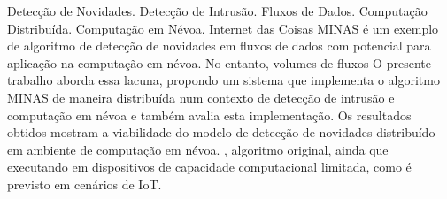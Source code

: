 \begin{resumo}{Detecção de Novidades. Detecção de Intrusão. Fluxos de Dados.
   Computação Distribuída. Computação em Névoa. Internet das Coisas}
   MINAS é um exemplo de algoritmo de detecção de novidades em fluxos de dados
   com potencial para aplicação na computação em névoa.
   No entanto,   volumes de fluxos
   O presente trabalho aborda essa lacuna, propondo um sistema que implementa o
   algoritmo MINAS de maneira distribuída num contexto de detecção de intrusão e
   computação em névoa e também avalia esta implementação.
   Os resultados obtidos mostram a viabilidade do modelo de detecção de
   novidades distribuído em ambiente de computação em névoa.
   , 
   algoritmo original, ainda que executando em dispositivos de capacidade
   computacional limitada, como é previsto em cenários de IoT.

\end{resumo}


